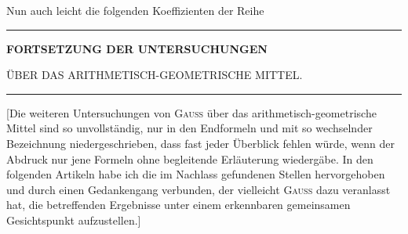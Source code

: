 \begingroup
\renewcommand{\arraystretch}{1.45}
Nun auch leicht die folgenden Koeffizienten der Reihe

\par\noindent\hfill\rule{0.25\linewidth}{0.4pt}\hfill\mbox{}\par
\clearpage{}
\begin{center}\bfseries
FORTSETZUNG DER UNTERSUCHUNGEN

ÜBER DAS ARITHMETISCH-GEOMETRISCHE MITTEL.

\rule{0.08\linewidth}{0.3pt}
\end{center}
[Die weiteren Untersuchungen von \textsc{Gauss} über das arithmetisch-geometrische Mittel sind so unvollständig, nur in den Endformeln und mit so wechselnder Bezeichnung niedergeschrieben, dass fast jeder Überblick fehlen würde, wenn der Abdruck nur jene Formeln ohne begleitende Erläuterung wiedergäbe. In den folgenden Artikeln habe ich die im Nachlass gefundenen Stellen hervorgehoben und durch einen Gedankengang verbunden, der vielleicht \textsc{Gauss} dazu veranlasst hat, die betreffenden Ergebnisse unter einem erkennbaren gemeinsamen Gesichtspunkt aufzustellen.]

